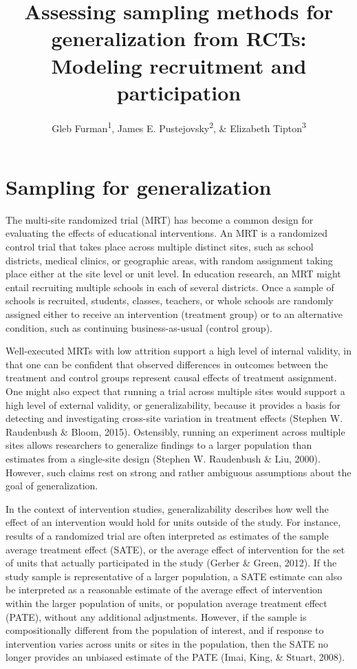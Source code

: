 \documentclass[
  english,
  man,floatsintext]{apa6}
\title{Assessing sampling methods for generalization from RCTs: Modeling recruitment and participation}
\author{Gleb Furman\textsuperscript{1}, James E. Pustejovsky\textsuperscript{2}, \& Elizabeth Tipton\textsuperscript{3}}
\date{}
\affiliation{\vspace{0.5cm}\textsuperscript{1} University of Texas at Austin\\\textsuperscript{2} University of Wisconsin-Madison\\\textsuperscript{3} Northwestern University}
\begin{document}
\maketitle

\hypertarget{sampling-for-generalization}{%
\section{Sampling for generalization}\label{sampling-for-generalization}}

The multi-site randomized trial (MRT) has become a common design for evaluating the effects of educational interventions. An MRT is a randomized control trial that takes place across multiple distinct sites, such as school districts, medical clinics, or geographic areas, with random assignment taking place either at the site level or unit level. In education research, an MRT might entail recruiting multiple schools in each of several districts. Once a sample of schools is recruited, students, classes, teachers, or whole schools are randomly assigned either to receive an intervention (treatment group) or to an alternative condition, such as continuing business-as-usual (control group).

Well-executed MRTs with low attrition support a high level of internal validity, in that one can be confident that observed differences in outcomes between the treatment and control groups represent causal effects of treatment assignment. One might also expect that running a trial across multiple sites would support a high level of external validity, or generalizability, because it provides a basis for detecting and investigating cross-site variation in treatment effects (Stephen W. Raudenbush \& Bloom, 2015). Ostensibly, running an experiment across multiple sites allows researchers to generalize findings to a larger population than estimates from a single-site design (Stephen W. Raudenbush \& Liu, 2000). However, such claims rest on strong and rather ambiguous assumptions about the goal of generalization.

In the context of intervention studies, generalizability describes how well the effect of an intervention would hold for units outside of the study. For instance, results of a randomized trial are often interpreted as estimates of the sample average treatment effect (SATE), or the average effect of intervention for the set of units that actually participated in the study (Gerber \& Green, 2012). If the study sample is representative of a larger population, a SATE estimate can also be interpreted as a reasonable estimate of the average effect of intervention within the larger population of units, or population average treatment effect (PATE), without any additional adjustments. However, if the sample is compositionally different from the population of interest, and if response to intervention varies across units or sites in the population, then the SATE no longer provides an unbiased estimate of the PATE (Imai, King, \& Stuart, 2008).
\end{document}
